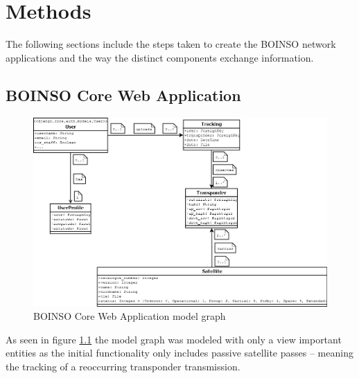 \documentclass[BachelorPaper]{subfiles}
\begin{document}
\chapter{Methods}
The following sections include the steps taken to create the BOINSO network applications and the way the distinct components exchange information.

\section{BOINSO Core Web Application}
\label{sec:methods_boinso_core}

\begin{figure}[!htbp]
\centering
\includegraphics[width=0.9\linewidth]{PICs/diagrams/boinso_core_models.png}
\caption{BOINSO Core Web Application model graph}\label{fig:boinso_core_models}
\end{figure}

As seen in figure \ref{fig:boinso_core_models} the model graph was modeled with only a view important entities as the initial functionality only includes passive satellite passes --  meaning the tracking of a reoccurring transponder transmission.
\end{document}
